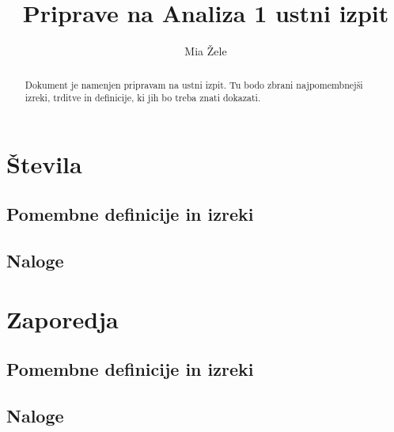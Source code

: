 \documentclass[a4paper,12pt]{report}
\begin{document}
\title{Priprave na Analiza 1 ustni izpit}
\author{Mia Žele}
\date{}

\maketitle

\tableofcontents

\begin{abstract}
    Dokument je namenjen pripravam na ustni izpit. Tu bodo zbrani najpomembnejši
    izreki, trditve in definicije, ki jih bo treba znati dokazati.
\end{abstract}


\chapter{Števila}

\section*{Pomembne definicije in izreki}

\pagebreak

\section*{Naloge}


\chapter{Zaporedja}

\section*{Pomembne definicije in izreki}

\pagebreak

\section*{Naloge}
\end{document}
